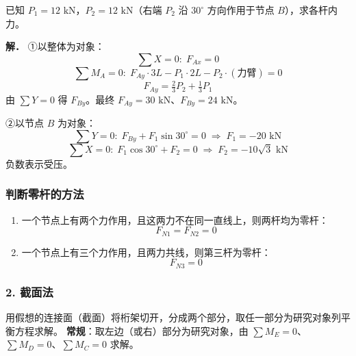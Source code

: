 \begin{example}[节点法求各杆内力]
已知 $P_1=12\text{ kN}$，$P_2=12\text{ kN}$（右端 $P_2$ 沿 $30^\circ$ 方向作用于节点 $B$），求各杆内力。

\textbf{解．}
①以整体为对象：
\begin{equation}
\sum X=0:\;F_{Ax}=0
\label{eq:2-例-节点-整体X}
\end{equation}
\begin{equation}
\sum M_A=0:\;F_{Ay}\cdot3L-P_1\cdot2L-P_2\cdot(\text{力臂})=0
\label{eq:2-例-节点-整体M}
\end{equation}
\begin{equation}
F_{Ay}=\tfrac23 P_2+\tfrac13 P_1
\label{eq:2-例-节点-FAy}
\end{equation}
由 $\sum Y=0$ 得 $F_{By}$。最终 $F_{Ay}=30\text{ kN}$、$F_{By}=24\text{ kN}$。

②以节点 $B$ 为对象：
\begin{equation}
\sum Y=0:\;F_{By}+F_1\sin30^\circ=0\;\Rightarrow\;F_1=-20\text{ kN}
\label{eq:2-例-节点-BY}
\end{equation}
\begin{equation}
\sum X=0:\;F_1\cos30^\circ+F_2=0\;\Rightarrow\;F_2=-10\sqrt3\text{ kN}
\label{eq:2-例-节点-BX}
\end{equation}
负数表示受压。
\end{example}

\subsubsection{判断零杆的方法}
\begin{enumerate}
\item 一个节点上有两个力作用，且这两力不在同一直线上，则两杆均为零杆：
\begin{equation}
F_{N1}=F_{N2}=0
\label{eq:2-零杆-两力}
\end{equation}
\item 一个节点上有三个力作用，且两力共线，则第三杆为零杆：
\begin{equation}
F_{N3}=0
\label{eq:2-零杆-三力}
\end{equation}
\end{enumerate}

\subsubsection{2. 截面法} 用假想的连接面（截面）将桁架切开，分成两个部分，取任一部分为研究对象列平衡方程求解。
\textbf{常规}：取左边（或右）部分为研究对象，由 $\sum M_E=0$、$\sum M_D=0$、$\sum M_C=0$ 求解。

